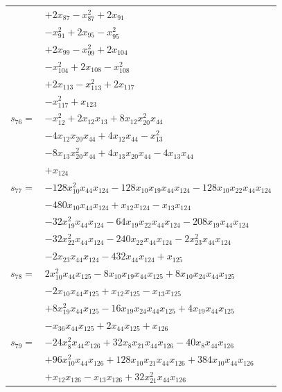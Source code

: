 \begin{longtable}{@{}r@{\;}l@{}}
 & \(\displaystyle +2x_{87} -x_{87}^{2} +2x_{91}\) \\
 & \(\displaystyle -x_{91}^{2} +2x_{95} -x_{95}^{2}\) \\
 & \(\displaystyle +2x_{99} -x_{99}^{2} +2x_{104}\) \\
 & \(\displaystyle -x_{104}^{2} +2x_{108} -x_{108}^{2}\) \\
 & \(\displaystyle +2x_{113} -x_{113}^{2} +2x_{117}\) \\
 & \(\displaystyle -x_{117}^{2} +x_{123}\) \\[3pt]
\(s_{76}=\) & \(\displaystyle -x_{12}^{2} +2x_{12}x_{13} +8x_{12}x_{20}^{2}x_{44}\) \\
 & \(\displaystyle -4x_{12}x_{20}x_{44} +4x_{12}x_{44} -x_{13}^{2}\) \\
 & \(\displaystyle -8x_{13}x_{20}^{2}x_{44} +4x_{13}x_{20}x_{44} -4x_{13}x_{44}\) \\
 & \(\displaystyle +x_{124}\) \\[3pt]
\(s_{77}=\) & \(\displaystyle -128x_{10}^{2}x_{44}x_{124} -128x_{10}x_{19}x_{44}x_{124} -128x_{10}x_{22}x_{44}x_{124}\) \\
 & \(\displaystyle -480x_{10}x_{44}x_{124} +x_{12}x_{124} -x_{13}x_{124}\) \\
 & \(\displaystyle -32x_{19}^{2}x_{44}x_{124} -64x_{19}x_{22}x_{44}x_{124} -208x_{19}x_{44}x_{124}\) \\
 & \(\displaystyle -32x_{22}^{2}x_{44}x_{124} -240x_{22}x_{44}x_{124} -2x_{23}^{2}x_{44}x_{124}\) \\
 & \(\displaystyle -2x_{23}x_{44}x_{124} -432x_{44}x_{124} +x_{125}\) \\[3pt]
\(s_{78}=\) & \(\displaystyle 2x_{10}^{2}x_{44}x_{125} -8x_{10}x_{19}x_{44}x_{125} +8x_{10}x_{24}x_{44}x_{125}\) \\
 & \(\displaystyle -2x_{10}x_{44}x_{125} +x_{12}x_{125} -x_{13}x_{125}\) \\
 & \(\displaystyle +8x_{19}^{2}x_{44}x_{125} -16x_{19}x_{24}x_{44}x_{125} +4x_{19}x_{44}x_{125}\) \\
 & \(\displaystyle -x_{36}x_{44}x_{125} +2x_{44}x_{125} +x_{126}\) \\[3pt]
\(s_{79}=\) & \(\displaystyle -24x_{8}^{2}x_{44}x_{126} +32x_{8}x_{21}x_{44}x_{126} -40x_{8}x_{44}x_{126}\) \\
 & \(\displaystyle +96x_{10}^{2}x_{44}x_{126} +128x_{10}x_{21}x_{44}x_{126} +384x_{10}x_{44}x_{126}\) \\
 & \(\displaystyle +x_{12}x_{126} -x_{13}x_{126} +32x_{21}^{2}x_{44}x_{126}\) \\

\end{longtable}
